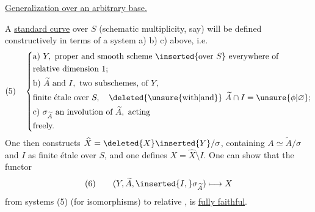 \uline{Generalization over an arbitrary base.}

A \uline{standard curve} over $S$ (schematic multiplicity, say) will be defined constructively in terms of a system a) b) c)  above, i.e.
\[
(5)\quad\left\{\begin{aligned}
&\text{a) }Y,\text{ proper and smooth scheme }\inserted{\text{over }S}\text{ everywhere of}\\
&\text{relative dimension }1;\\
&\text{b) }\widetilde A\text{ and }I,\text{ two subschemes, of }Y,\\
&\text{finite étale over }S,\quad\deleted{\unsure{\text{with}|\text{and}}}\ \widetilde A\cap I=\unsure{\phi|\varnothing};\\
&\text{c) }\sigma_{\widetilde A}\text{ an involution of }\widetilde A,\text{ acting}\\
&\text{freely.}
\end{aligned}\right.
\]
One then constructs $\widehat X=\deleted{X}\inserted{Y}/\sigma$, containing $A\simeq\widetilde A/\sigma$ and $I$ as   finite étale over $S$, and one defines $X=\widehat X\setminus I$. One can show that the functor
\[
(6)\qquad(Y,\widetilde A,\inserted{I,}\sigma_{\widetilde A})\longmapsto X
\]
from systems (5) (for isomorphisms) to relative  , is \uline{fully faithful}.
